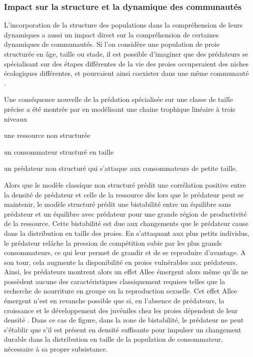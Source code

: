 \subsubsection{Impact sur la structure et la dynamique des communautés}

L'incorporation de la structure des populations dans la compréhension de leurs 
dynamiques a aussi un impact direct sur la compréhension de certaines dynamiques
de communautés. Si l'on considère une population de proie structurée en âge,
taille ou stade, il est possible d'imaginer que des prédateurs se
spécialisant sur des étapes différentes de la vie des proies 
occuperaient des niches écologiques différentes, et pourraient ainsi coexister dans une même
communauté \autocites{de-roos2003b}. 

Une conséquence nouvelle de la prédation spécialisée sur une classe de taille
précise a été montrée par \textcite{de-roos2002a} en modélisant une chaine
trophique linéaire à trois niveaux \begin{enumerate*}[label=(\roman*),
before=\unskip{ : }, itemjoin={{ ; }}, itemjoin*={{ ; et }}]\item une ressource
non structurée \item un consommateur structuré en taille \item un prédateur non
structuré qui s'attaque aux consommateurs de petite taille.\end{enumerate*}
Alors que le modèle classique non structuré prédit une corrélation positive
entre la densité de prédateur et celle de la ressource dès lors que le prédateur
peut se maintenir, le modèle structuré prédit une bistabilité entre un équilibre
sans prédateur et un équilibre avec prédateur pour une grande région de
productivité de la ressource. Cette bistabilité est due aux changements que le
prédateur cause dans la distribution en taille des proies. En s'attaquant aux
plus petits individus, le prédateur relâche la pression de compétition subie par
les plus grands consommateurs, ce qui leur permet de grandir et de se reproduire
d'avantage.
A son tour, cela augmente la disponibilité en proies vulnérables aux prédateurs.
Ainsi, les prédateurs montrent alors un effet Allee émergent alors même qu'ils
ne possèdent aucune des caractéristiques classiquement requises telles que la
recherche de nourriture en groupe ou la reproduction sexuelle. Cet effet Allee
émergent n'est en revanche possible que si, en l'absence de prédateurs, la
croissance et le développement des juvéniles chez les proies dépendent de leur
densité \autocites{de-roos2003a}. Dans ce cas de figure, dans la zone de
bistabilité, le prédateur ne peut s'établir que s'il est présent en densité
suffisante pour impulser un changement durable dans la distribution en taille de
la population de consommateur, nécessaire à sa propre subsistance.

